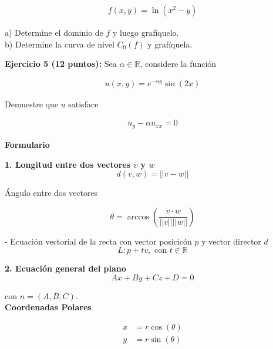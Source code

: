 \documentclass[a4paper]{article}
\begin{document}
\begin{align*}
    f(x,y) = \ln(x^2-y)
\end{align*}

a) Determine el dominio de $f$ y luego grafíquelo. \\

b) Determine la curva de nivel $C_0(f)$ y grafíquela.


\newpage


\phantom{xc}

\newpage

\textbf{Ejercicio 5 \textbf{(12 puntos)}:} Sea $\alpha \in \mathbb{R}$, considere la función

\begin{align*}
    u(x,y) = e^{-\alpha y} \sin(2x)
\end{align*}

Demuestre que $u$ satisface 

\begin{align*}
    u_y-\alpha u_{xx} =0
\end{align*}




\newpage

\phantom{xc}

\newpage

\begin{center}
\textbf{Formulario}
\end{center}

\bigskip

\textbf{1. Longitud entre dos vectores $v$ y $w$} \\[1mm]


 
\[
d(v,w) = || v-w||
\]

Ángulo entre dos vectores


\[
\theta = \arccos\left( \frac{v \cdot w}{||v|| ||w||}\right)
\]

- Ecuación vectorial de la recta con vector posicicón $p$ y vector director $d$ 
\[
L : p+tv, \text{ con } t\in \mathbb{R}
\]

\bigskip

\textbf{2. Ecuación general del plano} \\[1mm]


\[
Ax+By+Cz+D=0
\]

con $n=(A,B,C)$. \\




\textbf{Coordenadas Polares}

\begin{align*}
    x&= r\cos(\theta) \\
    y&=r\sin(\theta)
\end{align*}
\end{document}
